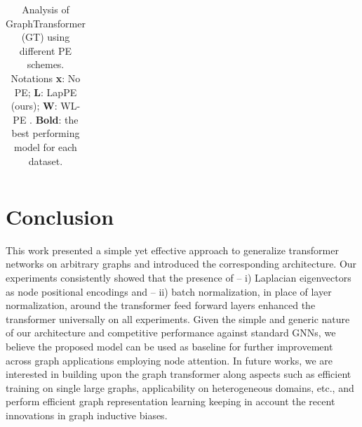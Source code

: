 \documentclass[letterpaper]{article} %
\begin{document}
\begin{table}[t!]
{\begin{tabular}{r|r|c|cccc}
        \bottomrule
        \end{tabular}
    }
    \caption{
    Analysis of GraphTransformer (GT) using different PE schemes. Notations \textbf{x}: No PE; \textbf{L}: LapPE (ours); \textbf{W}: WL-PE \cite{zhang2020graph}. 
    \textbf{Bold}: the best performing model for each dataset. 
    }
    \label{tab:results_ablation}
\end{table}


\section{Conclusion}
This work presented a simple yet effective approach to generalize transformer networks on arbitrary graphs and introduced the corresponding architecture. Our experiments consistently showed that the presence of -- i) Laplacian eigenvectors as node positional encodings and -- ii) batch normalization, in place of layer normalization, around the transformer feed forward layers enhanced the transformer universally on all experiments.
Given the simple and generic nature of our architecture and competitive performance against standard GNNs, we believe the proposed model can be used as baseline for further improvement across graph applications employing node attention. In future works, we are interested in building upon the graph transformer along aspects such as efficient training on single large graphs, applicability on heterogeneous domains, etc., and perform efficient graph representation learning keeping in account the recent innovations in graph inductive biases.


\end{document}
